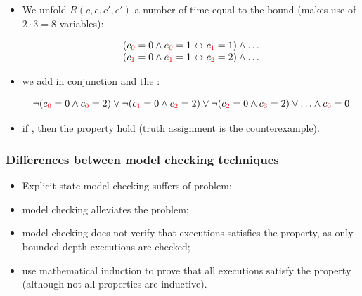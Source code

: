 \documentclass[usenames,dvipsnames]{beamer}
\begin{document}
\begin{frame}
\vspace{-0.3cm}
\begin{itemize} \pause
\item We unfold $R(c, e, c', e')$ a number of time equal to the bound	 (makes use of $2 \cdot 3 = 8$ variables):
\begin{scriptsize}
\[ 
\begin{array}{l}
(c_{\tc{red}{0}}=0 \land e_{\tc{red}{0}}=1 \leftrightarrow c_{\tc{red}{1}}=1) \land \ldots \\
(c_{\tc{red}{1}}=0 \land e_{\tc{red}{1}}=1 \leftrightarrow c_{\tc{red}{2}}=2) \land \ldots \\ 
\end{array} \]
\end{scriptsize}

\item we add  in conjunction and the :

\begin{scriptsize}

\[ \begin{array}{l} 
 	\neg (c_{\tc{red}{0}}=0 \land c_{\tc{red}{0}}=2) \lor 
 	 	\neg (c_{\tc{red}{1}}=0 \land c_{\tc{red}{2}}=2) \lor 
 	 	 	\neg (c_{\tc{red}{2}}=0 \land c_{\tc{red}{3}}=2) \lor \ldots \land c_{\tc{red}{0}}=0
 \end{array} \]
\end{scriptsize}

\item if , then the property  hold (truth assignment is the counterexample).

\end{itemize}
\end{frame}

\begin{frame}
  \frametitle{Differences between model checking techniques}
  
 \begin{itemize}
  \item Explicit-state model checking suffers of  problem;
  \item {} model checking alleviates the problem;
  \item {} model checking does not verify that  executions satisfies the property, as only bounded-depth executions are checked;
  \item {} use mathematical induction to prove that all executions satisfy the property (although not all properties are inductive).
\end{itemize}
  
\end{frame}
\end{document}

